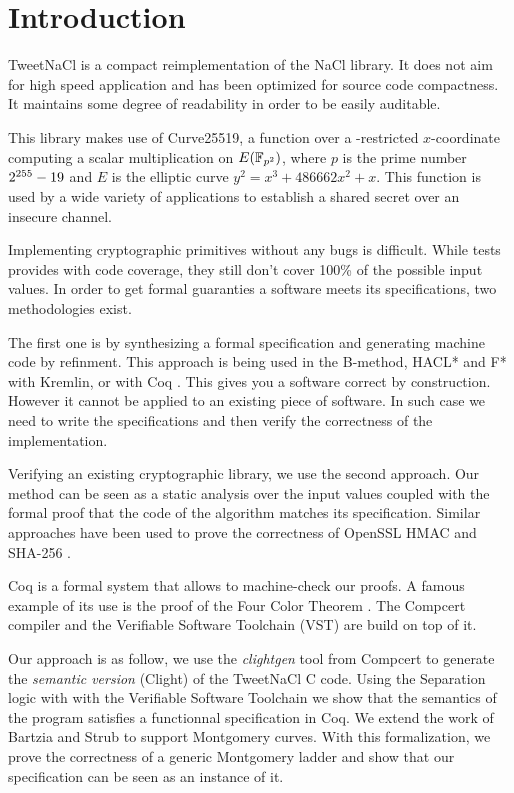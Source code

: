 \section{Introduction}

TweetNaCl\cite{BGJ+15} is a compact reimplementation of the
NaCl\cite{BLS12} library. It does not aim for high speed
application and has been optimized for source code compactness.
It maintains some degree of readability in order to be easily auditable.

This library makes use of Curve25519\cite{Ber06}, a function over a -restricted
$x$-coordinate computing a scalar multiplication on $E(\mathbb{F}_{p^2})$, where $p$ is
the prime number $2^{255}-19$ and $E$ is the elliptic curve $y^2 = x^3 + 486662 x^2 + x$.
This function is used by a wide variety of applications \cite{this-that-use-curve25519}
to establish a shared secret over an insecure channel.

Implementing cryptographic primitives without any bugs is difficult.
While tests provides with code coverage,
they still don't cover 100\% of the possible input values.
In order to get formal guaranties a software meets its specifications,
two methodologies exist.

The first one is by synthesizing a formal specification and
generating machine code by refinment. This approach is being used in the
B-method\cite{Abrial:1996:BAP:236705}, HACL*\cite{zinzindohoue2017hacl} and F* \cite{DBLP:journals/corr/BhargavanDFHPRR17}
with Kremlin, or with Coq \cite{CpdtJFR}.
This gives you a software correct by construction. However it cannot be applied
to an existing piece of software. In such case we need to write the specifications
and then verify the correctness of the implementation.

Verifying an existing cryptographic library, we use the second approach.
Our method can be seen as a static analysis over the input values coupled
with the formal proof that the code of the algorithm matches its specification.
Similar approaches have been used to prove the correctness of OpenSSL HMAC
\cite{Beringer2015VerifiedCA} and SHA-256 \cite{2015-Appel}.

Coq is a formal system that allows to machine-check our proofs.
A famous example of its use is the proof of the Four Color Theorem \cite{gonthier2008formal}.
The Compcert\cite{Leroy-backend} compiler and the Verifiable Software Toolchain
(VST)\cite{2012-Appel} are build on top of it.

Our approach is as follow, we use the \textit{clightgen} tool from Compcert to
generate the \textit{semantic version} (Clight\cite{Blazy-Leroy-Clight-09}) of
the TweetNaCl C code.
Using the Separation logic\cite{1969-Hoare,Reynolds02separationlogic}
with with the Verifiable Software Toolchain we show that the semantics of the
program satisfies a functionnal specification in Coq.
We extend the work of Bartzia and Strub \cite{DBLP:conf/itp/BartziaS14} to
support Montgomery curves.
With this formalization, we prove the correctness of a generic Montgomery ladder
and show that our specification can be seen as an instance of it.

